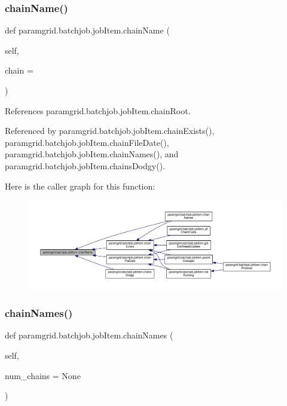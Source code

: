 \subsubsection{\texorpdfstring{chain\+Name()}{chainName()}}
{\footnotesize\ttfamily def paramgrid.\+batchjob.\+job\+Item.\+chain\+Name (\begin{DoxyParamCaption}\item[{}]{self,  }\item[{}]{chain = {} }\end{DoxyParamCaption})}



References paramgrid.\+batchjob.\+job\+Item.\+chain\+Root.



Referenced by paramgrid.\+batchjob.\+job\+Item.\+chain\+Exists(), paramgrid.\+batchjob.\+job\+Item.\+chain\+File\+Date(), paramgrid.\+batchjob.\+job\+Item.\+chain\+Names(), and paramgrid.\+batchjob.\+job\+Item.\+chains\+Dodgy().

Here is the caller graph for this function\+:
\nopagebreak
\begin{figure}[H]
\begin{center}
\leavevmode
\includegraphics[width=350pt]{classparamgrid_1_1batchjob_1_1jobItem_a94c6718acb448e4fe0a55ef0e80cf594_icgraph}
\end{center}
\end{figure}
\mbox{\label{classparamgrid_1_1batchjob_1_1jobItem_a80e05d711d7f3324d6a8a71fd2442592}} 
\subsubsection{\texorpdfstring{chain\+Names()}{chainNames()}}
{\footnotesize\ttfamily def paramgrid.\+batchjob.\+job\+Item.\+chain\+Names (\begin{DoxyParamCaption}\item[{}]{self,  }\item[{}]{num\+\_\+chains = {\ttfamily None} }\end{DoxyParamCaption})}



